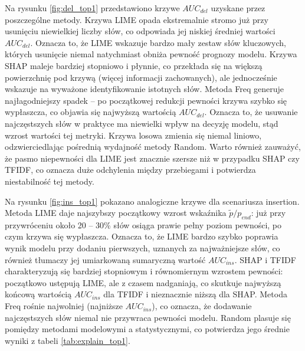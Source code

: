 \documentclass[wmii, inf, mgr]{uwmthesis}
\begin{document}
Na rysunku \ref{fig:del_top1} przedstawiono krzywe $AUC_{del}$ uzyskane przez poszczególne metody. Krzywa LIME opada ekstremalnie stromo już przy usunięciu niewielkiej liczby słów, co odpowiada jej niskiej średniej wartości $AUC_{del}$. Oznacza to, że LIME wskazuje bardzo mały zestaw słów kluczowych, których usunięcie niemal natychmiast obniża pewność prognozy modelu. Krzywa SHAP maleje bardziej stopniowo i płynnie, co przekłada się na większą powierzchnię pod krzywą (więcej informacji zachowanych), ale jednocześnie wskazuje na wyważone identyfikowanie istotnych słów. Metoda Freq generuje najłagodniejszy spadek -- po początkowej redukcji pewności krzywa szybko się wypłaszcza, co objawia się najwyższą wartością $AUC_{del}$. Oznacza to, że usuwanie najczęstszych słów w praktyce ma niewielki wpływ na decyzję modelu, stąd wzrost wartości tej metryki. Krzywa losowa zmienia się niemal liniowo, odzwierciedlając pośrednią wydajność metody Random. Warto również zauważyć, że pasmo niepewności dla LIME jest znacznie szersze niż w przypadku SHAP czy TFIDF, co oznacza duże odchylenia między przebiegami i potwierdza niestabilność tej metody. 

Na rysunku \ref{fig:ins_top1} pokazano analogiczne krzywe dla scenariusza insertion. Metoda LIME daje najszybszy początkowy wzrost wskaźnika $\tilde{p} / p_{end}$: już przy przywróceniu około 20 -- 30\% słów osiąga prawie pełny poziom pewności, po czym krzywa się wypłaszcza. Oznacza to, że LIME bardzo szybko poprawia wynik modelu przy dodaniu pierwszych, uznanych za najważniejsze słów, co również tłumaczy jej umiarkowaną sumaryczną wartość $AUC_{ins}$. SHAP i TFIDF charakteryzują się bardziej stopniowym i równomiernym wzrostem pewności: początkowo ustępują LIME, ale z czasem nadganiają, co skutkuje najwyższą końcową wartością $AUC_{ins}$ dla TFIDF i nieznacznie niższą dla SHAP. Metoda Freq rośnie najwolniej (najniższe $AUC_{ins}$), co oznacza, że dodawanie najczęstszych słów niemal nie przywraca pewności modelu. Random plasuje się pomiędzy metodami modelowymi a statystycznymi, co potwierdza jego średnie wyniki z tabeli \ref{tab:explain_top1}.
\end{document}
